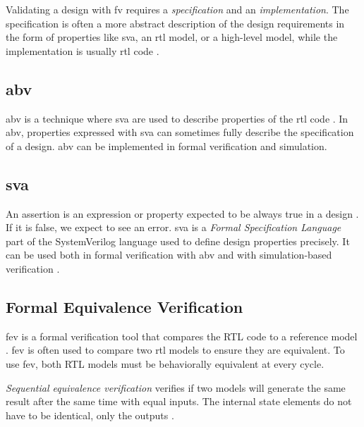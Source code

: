 Validating a design with \acrshort{fv} requires a \textit{specification} and an \textit{implementation}. The specification is often a more abstract description of the design requirements in the form of properties like \acrfull{sva}, an \acrshort{rtl} model, or a high-level model, while the implementation is usually \acrshort{rtl} code \cite{seligmanFormalVerificationEssential2015}. 


\subsection{\acrfull{abv}}

\acrfull{abv} is a technique where \acrfull{sva} are used to describe properties of the \acrshort{rtl} code \cite{seligmanFormalVerificationEssential2015}. In \acrshort{abv}, properties expressed with \acrshort{sva} can sometimes fully describe the specification of a design. \acrshort{abv} can be implemented in formal verification and simulation.

\subsection{\acrfull{sva}}

An assertion is an expression or property expected to be always true in a design \cite{mehtaSystemVerilogAssertions2020}. If it is false, we expect to see an error. 
\acrfull{sva} is a \textit{Formal Specification Language} part of the SystemVerilog language used to define design properties precisely. It can be used both in formal verification with \acrfull{abv} and with simulation-based verification \cite{cernySVAPowerAssertions2015}.

\subsection{Formal Equivalence Verification}

\acrfull{fev} is a formal verification tool that compares the RTL code to a reference model \cite{seligmanFormalVerificationEssential2015}. \acrshort{fev} is often used to compare two \acrshort{rtl} models to ensure they are equivalent. To use \acrshort{fev}, both RTL models must be behaviorally equivalent at every cycle.

\textit{Sequential equivalence verification} verifies if two models will generate the same result after the same time with equal inputs. The internal state elements do not have to be identical, only the outputs \cite{seligmanFormalVerificationEssential2015}.

